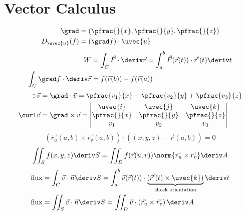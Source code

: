 \documentclass[10pt, a4paper]{article}
\begin{document}

\section{Vector Calculus}
\vspace{-0.5cm}
\begin{multicols}{2}

    \begin{align*}
        \grad &= \left(\pfrac{}{x}, \pfrac{}{y}, \pfrac{}{z}\right) \\
        D_{\uvec{u}}(f) &= \left(\grad f\right) \cdot \uvec{u}
    \end{align*}
    \begin{align*}
        W &= \int_{C} \vec{F} \cdot \deriv \vec{r} 
            = \int_{a}^{b} \vec{F}(\vec{r}(t)) \cdot \vec{r}'(t) \deriv t \\
        \int_{C} \grad f \cdot \deriv \vec{r} &= f(\vec{r}(b)) - f(\vec{r}(a))
    \end{align*}
    \begin{align*}
        \div \vec{v} &= \grad \cdot \vec{v} = \pfrac{v_1}{x} + \pfrac{v_2}{y} + \pfrac{v_3}{z} \\
        \curl \vec{v} &= \grad \times \vec{v} = 
            \begin{vmatrix}
                \uvec{i} & \uvec{j} & \uvec{k} \\
                \pfrac{}{x} & \pfrac{}{y} & \pfrac{}{z} \\
                v_1 & v_2 & v_3
            \end{vmatrix}
    \end{align*}
    \[
        \left(\vec{r_{u}}(a, b) \times \vec{r_{v}}(a, b)\right) \cdot
        \left((x, y, z) - \vec{r}(a, b) \right) = 0
    \]
    \[
        \iint_{S} f(x, y, z) \deriv S =
        \iint_{D} f(\vec{r}(u, v)) \norm{\vec{r_{u}} \times \vec{r_{v}}} \deriv A
    \]
    \vfill\columnbreak
    \begin{align*}
        \mathrm{flux} &= \int_{C} \vec{v} \cdot \vec{n} \deriv S 
            = \int_{a}^{b} \vec{v}(\vec{r}(t)) \cdot
            \underbrace{
                \left( \vec{r} '(t) \times \uvec{k} \right)
            }_{\text{check orientation}}
            \deriv t \\
        \mathrm{flux} &= \iint_{S} \vec{v} \cdot \vec{n} \deriv S =
            \iint_{D} \vec{v} \cdot \left(\vec{r_{u}} \times \vec{r_{v}}\right) \deriv A \\

\end{align*}
\end{multicols}
\end{document}

